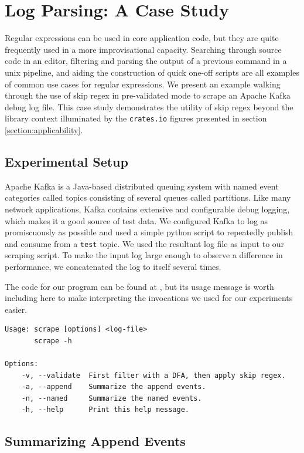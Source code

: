 \section{Log Parsing: A Case Study}

Regular expressions can be used in core application code, but they
are quite frequently used in a more improvisational capacity.
Searching through source code in an editor, filtering and parsing
the output of a previous command in a unix pipeline, and aiding
the construction of quick one-off scripts are all examples of
common use cases for regular expressions. We present an example
walking through the use of skip regex in pre-validated mode
to scrape an Apache Kafka debug log file. This case study
demonstrates the utility of skip regex beyond the library context
illuminated by the \verb'crates.io' figures presented in section
\ref{section:applicability}.

\subsection{Experimental Setup}

Apache Kafka is a Java-based distributed queuing system with
named event categories called topics consisting of several
queues called partitions. Like many network applications,
Kafka contains extensive and configurable debug logging,
which makes it a good source of test data. We configured
Kafka to log as promiscuously as possible and used a simple
python script to repeatedly publish and consume from a 
\verb'test' topic. We used the resultant log file as input
to our scraping script. To make the input log large enough
to observe a difference in performance, we concatenated the
log to itself several times.

The code for our program can be found at \cite{PailesSkipRegexCaseStudy},
but its usage message is worth including here to make
interpreting the invocations we used for our experiments
easier.

\begin{verbatim}
Usage: scrape [options] <log-file>
       scrape -h

Options:
    -v, --validate  First filter with a DFA, then apply skip regex.
    -a, --append    Summarize the append events.
    -n, --named     Summarize the named events.
    -h, --help      Print this help message.
\end{verbatim}

\subsection{Summarizing Append Events}


